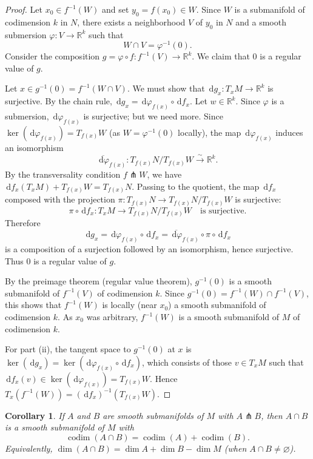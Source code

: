 \documentclass[12pt,a4paper,openany]{book}
\newtheorem{corollary}[theorem]{Corollary}
\theoremstyle{definition}
\theoremstyle{remark}
\newcommand{\R}{\mathbb{R}}
\newcommand{\dd}{\,\mathrm{d}}
\begin{document}
\begin{proof}
Let $x_0 \in f^{-1}(W)$ and set $y_0 = f(x_0) \in W$.
Since $W$ is a submanifold of codimension $k$ in $N$, there exists a
neighborhood $V$ of $y_0$ in $N$ and a smooth submersion
$\varphi \colon V \to \R^k$ such that
\[
  W \cap V = \varphi^{-1}(0).
\]
Consider the composition $g = \varphi \circ f \colon f^{-1}(V) \to \R^k$.
We claim that $0$ is a regular value of $g$.

Let $x \in g^{-1}(0) = f^{-1}(W \cap V)$. We must show that
$\dd g_x \colon T_x M \to \R^k$ is surjective. By the chain rule,
$\dd g_x = \dd\varphi_{f(x)} \circ \dd f_x$. Let $w \in \R^k$. Since
$\varphi$ is a submersion, $\dd\varphi_{f(x)}$ is surjective; but we need
more. Since $\ker(\dd\varphi_{f(x)}) = T_{f(x)}W$ (as $W = \varphi^{-1}(0)$
locally), the map $\dd\varphi_{f(x)}$ induces an isomorphism
\[
  \overline{\dd\varphi}_{f(x)} \colon T_{f(x)}N / T_{f(x)}W
    \xrightarrow{\;\sim\;} \R^k.
\]
By the transversality condition $f \pitchfork W$, we have
$\dd f_x(T_x M) + T_{f(x)}W = T_{f(x)}N$. Passing to the quotient,
the map $\dd f_x$ composed with the projection
$\pi \colon T_{f(x)}N \to T_{f(x)}N / T_{f(x)}W$ is surjective:
\[
  \pi \circ \dd f_x \colon T_x M \to T_{f(x)}N / T_{f(x)}W
  \quad \text{is surjective.}
\]
Therefore
\[
  \dd g_x = \dd\varphi_{f(x)} \circ \dd f_x
  = \overline{\dd\varphi}_{f(x)} \circ \pi \circ \dd f_x
\]
is a composition of a surjection followed by an isomorphism, hence surjective.
Thus $0$ is a regular value of $g$.

By the preimage theorem (regular value theorem), $g^{-1}(0)$ is a smooth
submanifold of $f^{-1}(V)$ of codimension $k$. Since
$g^{-1}(0) = f^{-1}(W) \cap f^{-1}(V)$, this shows that $f^{-1}(W)$ is
locally (near $x_0$) a smooth submanifold of codimension $k$. As $x_0$ was
arbitrary, $f^{-1}(W)$ is a smooth submanifold of $M$ of codimension $k$.

For part (ii), the tangent space to $g^{-1}(0)$ at $x$ is
$\ker(\dd g_x) = \ker(\dd\varphi_{f(x)} \circ \dd f_x)$, which consists
of those $v \in T_x M$ such that $\dd f_x(v) \in \ker(\dd\varphi_{f(x)})
= T_{f(x)}W$. Hence $T_x(f^{-1}(W)) = (\dd f_x)^{-1}(T_{f(x)}W)$.
\end{proof}

\begin{corollary}\label{cor:transverse-submanifolds-intersection}
If $A$ and $B$ are smooth submanifolds of $M$ with $A \pitchfork B$, then
$A \cap B$ is a smooth submanifold of $M$ with
\[
  \operatorname{codim}(A \cap B) = \operatorname{codim}(A)
    + \operatorname{codim}(B).
\]
Equivalently, $\dim(A \cap B) = \dim A + \dim B - \dim M$ (when $A \cap B
\neq \varnothing$).
\end{corollary}
\end{document}
